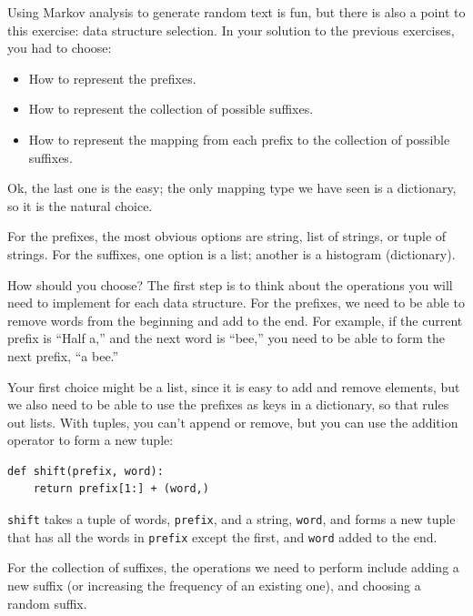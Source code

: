 \documentclass[10pt]{book}
\begin{document}
{Using Markov analysis to generate random text is fun, but there is
also a point to this exercise: data structure selection.  In your
solution to the previous exercises, you had to choose:

\begin{itemize}

\item How to represent the prefixes.

\item How to represent the collection of possible suffixes.

\item How to represent the mapping from each prefix to
the collection of possible suffixes.

\end{itemize}

Ok, the last one is the easy; the only mapping type we have
seen is a dictionary, so it is the natural choice.

For the prefixes, the most obvious options are string,
list of strings, or tuple of strings.  For the suffixes,
one option is a list; another is a histogram (dictionary).


How should you choose?  The first step is to think about
the operations you will need to implement for each data structure.
For the prefixes, we need to be able to remove words from
the beginning and add to the end.  For example, if the current
prefix is ``Half a,'' and the next word is ``bee,'' you need
to be able to form the next prefix, ``a bee.''


Your first choice might be a list, since it is easy to add
and remove elements, but we also need to be able to use the
prefixes as keys in a dictionary, so that rules out lists.
With tuples, you can't append or remove, but you can use
the addition operator to form a new tuple:

\beforeverb
\begin{verbatim}
def shift(prefix, word):
    return prefix[1:] + (word,)
\end{verbatim}
\afterverb
%
{\tt shift} takes a tuple of words, {\tt prefix}, and a string, 
{\tt word}, and forms a new tuple that has all the words
in {\tt prefix} except the first, and {\tt word} added to
the end.

For the collection of suffixes, the operations we need to
perform include adding a new suffix (or increasing the frequency
of an existing one), and choosing a random suffix.

}
\end{document}

